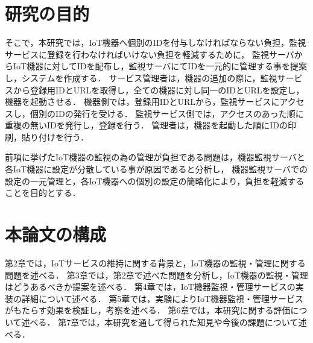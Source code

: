 \section{研究の目的}
そこで，本研究では，IoT機器へ個別のIDを付与しなければならない負担，監視サービスに登録を行わなければいけない負担を軽減するために，
監視サーバからIoT機器に対してIDを配布し，監視サーバにてIDを一元的に管理する事を提案し，システムを作成する．
サービス管理者は，機器の追加の際に，監視サービスから登録用IDとURLを取得し，全ての機器に対し同一のIDとURLを設定し，機器を起動させる．
機器側では，登録用IDとURLから，監視サービスにアクセスし，個別のIDの発行を受ける．
監視サービス側では，アクセスのあった順に重複の無いIDを発行し，登録を行う．
管理者は，機器を起動した順にIDの印刷，貼り付けを行う．
\medskip

前項に挙げたIoT機器の監視の為の管理が負担である問題は，機器監視サーバと各IoT機器に設定が分散している事が原因であると分析し，
機器監視サーバでの設定の一元管理と，各IoT機器への個別の設定の簡略化により，負担を軽減することを目的とする．

\section{本論文の構成}
第2章では，IoTサービスの維持に関する背景と，IoT機器の監視・管理に関する問題を述べる．
第3章では，第2章で述べた問題を分析し，IoT機器の監視・管理はどうあるべきか提案を述べる．
第4章では，IoT機器監視・管理サービスの実装の詳細について述べる．
第5章では，実験によりIoT機器監視・管理サービスがもたらす効果を検証し，考察を述べる．
第6章では，本研究に関する評価について述べる．
第7章では，本研究を通して得られた知見や今後の課題について述べる．


